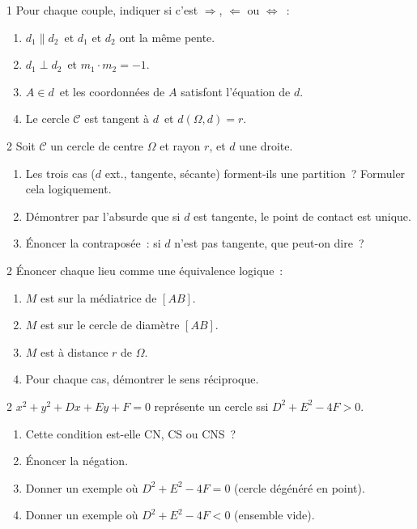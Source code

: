 \begin{exo}{1}
Pour chaque couple, indiquer si c'est $\Rightarrow$, $\Leftarrow$ ou $\Leftrightarrow$~:
\begin{enumerate}
  \item \og $d_1\parallel d_2$\fg\ et \og $d_1$ et $d_2$ ont la m\^eme pente\fg.
  \item \og $d_1\perp d_2$\fg\ et \og $m_1\cdot m_2=-1$\fg.
  \item \og $A\in d$\fg\ et \og les coordonn\'ees de $A$ satisfont l'\'equation de $d$\fg.
  \item \og Le cercle $\mathcal{C}$ est tangent \`a $d$\fg\ et \og $d(\Omega,d)=r$\fg.
\end{enumerate}
\end{exo}

\begin{exo}{2}
Soit $\mathcal{C}$ un cercle de centre $\Omega$ et rayon $r$, et $d$ une droite.
\begin{enumerate}
  \item Les trois cas ($d$ ext., tangente, s\'ecante) forment-ils une partition~?
        Formuler cela logiquement.
  \item D\'emontrer par l'absurde que si $d$ est tangente,
        le point de contact est unique.
  \item \'Enoncer la contrapos\'ee~:
        si $d$ n'est pas tangente, que peut-on dire~?
\end{enumerate}
\end{exo}

\begin{exo}{2}
\'Enoncer chaque lieu comme une \'equivalence logique~:
\begin{enumerate}
  \item $M$ est sur la m\'ediatrice de $[AB]$.
  \item $M$ est sur le cercle de diam\`etre $[AB]$.
  \item $M$ est \`a distance $r$ de $\Omega$.
  \item Pour chaque cas, d\'emontrer le sens r\'eciproque.
\end{enumerate}
\end{exo}

\begin{exo}{2}
$x^2+y^2+Dx+Ey+F=0$ repr\'esente un cercle ssi $D^2+E^2-4F>0$.
\begin{enumerate}
  \item Cette condition est-elle CN, CS ou CNS~?
  \item \'Enoncer la n\'egation.
  \item Donner un exemple o\`u $D^2+E^2-4F=0$ (cercle d\'eg\'en\'er\'e en point).
  \item Donner un exemple o\`u $D^2+E^2-4F<0$ (ensemble vide).
\end{enumerate}
\end{exo}

